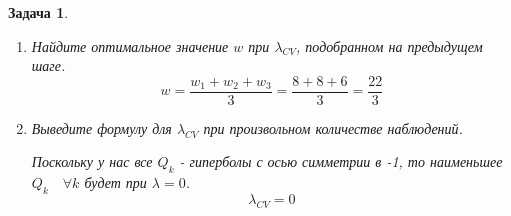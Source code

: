 \documentclass[12pt,fleqn]{article}
\newtheorem{esProblem}{Задача}
\begin{document}
\begin{esProblem}
\begin{enumerate}
    \begin{gather*}
	w_1 = w_2 = \frac{\frac{1}{2} (6+10)}{1+\lambda} = \frac{8}{1+\lambda} \\
	w_3 = \frac{\frac{1}{2}(6+6)}{1+\lambda} = \frac{6}{1+\lambda}\\
	Q_1 = Q_2 = \left( 6 - \frac{8}{1+\lambda} \right)^2 + \left( \frac{8}{1+\lambda} \right)^2 \lambda = 36-\frac{96}{1+\lambda} + (1+\lambda) \left( \frac{8}{1+\lambda} \right)^2 = \\ = 36 + \frac{64-96}{1+\lambda} = 36 - \frac{32}{1+\lambda}\\
	Q_3 = \left( 10 - \frac{6}{1+\lambda} \right)^2 + \left(\frac{6}{1+\lambda}\right)^2 \lambda = 100 -\frac{120}{1+\lambda} + (1+\lambda) \left( \frac{6}{1+\lambda} \right)^2 = \\ = 100 + \frac{36-120}{1+\lambda} = 100 - \frac{84}{1+\lambda}\\
	Q_{CV} =  \frac{Q_1+Q_2+Q_3}{3} = \frac{2 \left( 36 - \frac{32}{1+\lambda} \right) + 100 - \frac{84}{1+\lambda}}{3} = \frac{172-\frac{148}{1+\lambda}}{3}\\
	Q_{CV}' = \frac{148}{3(1+\lambda)^2} \geq 0 \quad \forall \lambda \geq 0 \quad \Rightarrow \lambda = 0
    \end{gather*}
	\item Найдите оптимальное значение $w$ при $\lambda_{CV}$, подобранном на предыдущем шаге. 
	\[
	w = \frac{w_1+w_2+w_3}{3} = \frac{8 + 8 + 6}{3} = \frac{22}{3}
	\]
    \item Выведите формулу для $\lambda_{CV}$ при произвольном количестве наблюдений.
    
    Поскольку у нас все $Q_k$ - гиперболы с осью симметрии в -1, то наименьшее $Q_k \quad \forall k$ будет при $\lambda = 0$.
    \[ \lambda_{CV} = 0 \]
\end{enumerate}
\end{esProblem}
\end{document}
